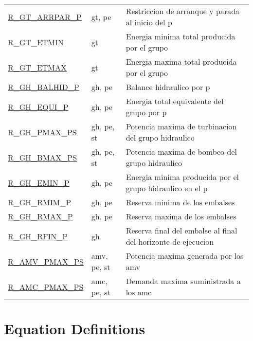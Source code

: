 \documentclass[11pt]{article}
\begin{document}
\begin{tabular}{|l|l|l|}
\hyperref[R_GT_ARRPAR_P]{R\_GT\_ARRPAR\_P} & gt, pe & Restriccion de arranque y parada al inicio del p \\ 
\hyperref[R_GT_ETMIN]{R\_GT\_ETMIN} & gt & Energia minima total producida por el grupo \\ 
\hyperref[R_GT_ETMAX]{R\_GT\_ETMAX} & gt & Energia maxima total producida por el grupo \\ 
\hyperref[R_GH_BALHID_P]{R\_GH\_BALHID\_P} & gh, pe & Balance hidraulico por p \\ 
\hyperref[R_GH_EQUI_P]{R\_GH\_EQUI\_P} & gh, pe & Energia total equivalente del grupo por p \\ 
\hyperref[R_GH_PMAX_PS]{R\_GH\_PMAX\_PS} & gh, pe, st & Potencia maxima de turbinacion del grupo hidraulico \\ 
\hyperref[R_GH_BMAX_PS]{R\_GH\_BMAX\_PS} & gh, pe, st & Potencia maxima de bombeo del grupo hidraulico \\ 
\hyperref[R_GH_EMIN_P]{R\_GH\_EMIN\_P} & gh, pe & Energia minima producida por el grupo hidraulico en el p \\ 
\hyperref[R_GH_RMIM_P]{R\_GH\_RMIM\_P} & gh, pe & Reserva minima de los embalses \\ 
\hyperref[R_GH_RMAX_P]{R\_GH\_RMAX\_P} & gh, pe & Reserva maxima de los embalses \\ 
\hyperref[R_GH_RFIN_P]{R\_GH\_RFIN\_P} & gh & Reserva final del embalse al final del horizonte de ejecucion \\ 
\hyperref[R_AMV_PMAX_PS]{R\_AMV\_PMAX\_PS} & amv, pe, st & Potencia maxima generada por los amv \\ 
\hyperref[R_AMC_PMAX_PS]{R\_AMC\_PMAX\_PS} & amc, pe, st & Demanda maxima suministrada a los amc \\ 
\hline 
\end{tabular}
\section*{Equation Definitions}
\end{document}
